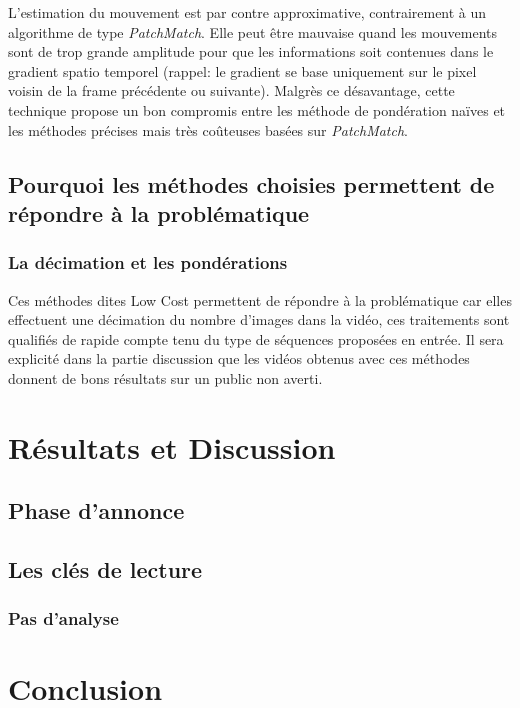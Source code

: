 \documentclass[fleqn,10pt]{SelfArx} %
\begin{document}
L'estimation du mouvement est par contre approximative, contrairement à un algorithme de type {\em PatchMatch}.
Elle peut être mauvaise quand les mouvements sont de trop grande amplitude pour que les informations soit contenues dans 
le gradient spatio temporel (rappel: le gradient se base uniquement sur le pixel voisin de la frame précédente
ou suivante). Malgrès ce désavantage, cette technique propose un bon compromis entre les méthode de
pondération naïves et les méthodes précises mais très coûteuses basées sur {\em PatchMatch}.

\subsection{Pourquoi les méthodes choisies permettent de répondre à la problématique}

\subsubsection{La décimation et les pondérations}
Ces méthodes dites \og Low Cost \fg{} permettent de répondre à la problématique car elles effectuent une décimation du nombre d'images dans la vidéo, ces traitements sont qualifiés de rapide compte tenu du type de séquences proposées en entrée. Il sera explicité dans la partie discussion que les vidéos obtenus avec ces méthodes donnent de bons résultats sur un public non averti.

\section{Résultats et Discussion}

\subsection{Phase d'annonce}

\subsection{Les clés de lecture}

\subsubsection{Pas d'analyse}


\section{Conclusion}
\end{document}
